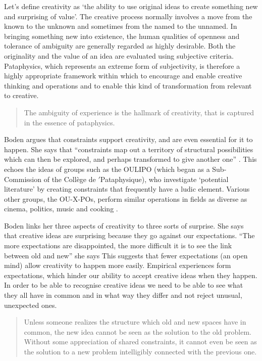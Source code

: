 Let's define creativity as `the ability to use original ideas to create something new and surprising of value'. The creative process normally involves a move from the known to the unknown and sometimes from the named to the unnamed. In bringing something new into existence, the human qualities of openness and tolerance of ambiguity are generally regarded as highly desirable. Both the originality and the value of an idea are evaluated using subjective criteria. Pataphysics, which represents an extreme form of subjectivity, is therefore a highly appropriate framework within which to encourage and enable creative thinking and operations and to enable this kind of transformation from relevant to creative.

\begin{quotation}
  The ambiguity of experience is the hallmark of creativity, that is captured in the essence of pataphysics. 
\end{quotation}

Boden argues that constraints support creativity, and are even essential for it to happen. She says that ``constraints map out a territory of structural possibilities which can then be explored, and perhaps transformed to give another one'' \autocite*{Boden2003}. This echoes the ideas of groups such as the \ac{OULIPO} (which began as a Sub-Commission of the Collège de $'$Pataphysique), who investigate `potential literature' by creating constraints that frequently have a ludic element. Various other groups, the OU-X-POs, perform similar operations in fields as diverse as cinema, politics, music and cooking \autocite{Motte2007}.

Boden links her three aspects of creativity to three sorts of surprise. She says that creative ideas are surprising because they go against our expectations. ``The more expectations are disappointed, the more difficult it is to see the link between old and new'' she says \autocite*{Boden2003} This suggests that fewer expectations (an open mind) allow creativity to happen more easily. Empirical experiences form expectations, which hinder our ability to accept creative ideas when they happen. In order to be able to recognise creative ideas we need to be able to see what they all have in common and in what way they differ and not reject unusual, unexpected ones.

\begin{quotation}
  Unless someone realizes the structure which old and new spaces have in common, the new idea cannot be seen as the solution to the old problem. Without some appreciation of shared constraints, it cannot even be seen as the solution to a new problem intelligibly connected with the previous one. 
\end{quotation}

